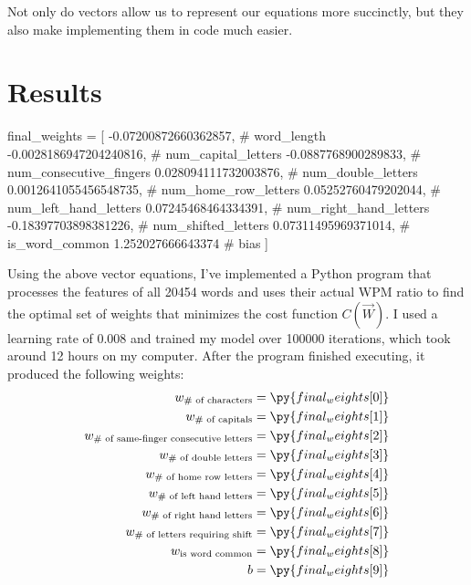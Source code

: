 \documentclass[12pt]{article}
\begin{document}
Not only do vectors allow us to represent our equations more succinctly, but they also make implementing them in code much easier.

\section*{Results}

\begin{pycode}
final_weights = [
	-0.07200872660362857, # word_length
	-0.0028186947204240816, # num_capital_letters
	-0.0887768900289833, # num_consecutive_fingers
	0.028094111732003876, # num_double_letters
	0.0012641055456548735, # num_home_row_letters
	0.05252760479202044, # num_left_hand_letters
	0.07245468464334391, # num_right_hand_letters
	-0.18397703898381226, # num_shifted_letters
	0.07311495969371014, # is_word_common
	1.252027666643374 # bias
]
\end{pycode}

Using the above vector equations, I've implemented a Python program that processes the features of all 20454 words and uses their actual WPM ratio to find the optimal set of weights that minimizes the cost function $C(\vec{W})$. I used a learning rate of 0.008 and trained my model over 100000 iterations, which took around 12 hours on my computer. After the program finished executing, it produced the following weights:
\begin{align*}
	w_{\text{\# of characters}}
	 & = \py{final_weights[0]}
	\\
	w_{\text{\# of capitals}}
	 & = \py{final_weights[1]}
	\\
	w_{\text{\# of same-finger consecutive letters}}
	 & = \py{final_weights[2]}
	\\
	w_{\text{\# of double letters}}
	 & = \py{final_weights[3]}
	\\
	w_{\text{\# of home row letters}}
	 & = \py{final_weights[4]}
	\\
	w_{\text{\# of left hand letters}}
	 & = \py{final_weights[5]}
	\\
	w_{\text{\# of right hand letters}}
	 & = \py{final_weights[6]}
	\\
	w_{\text{\# of letters requiring shift}}
	 & = \py{final_weights[7]}
	\\
	w_{\text{is word common}}
	 & =\py{final_weights[8]}
	\\
	b
	 & = \py{final_weights[9]}
\end{align*}
\end{document}
